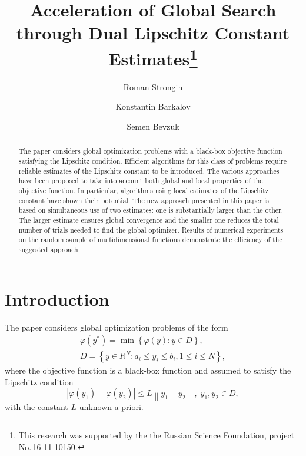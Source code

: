 \documentclass[runningheads]{llncs}
\begin{document}
%
\title{Acceleration of Global Search through Dual Lipschitz Constant Estimates\thanks{This research was supported by the the Russian Science Foundation, project No.\,16-11-10150.}}
%
%
\author{Roman Strongin%
\and Konstantin Barkalov%
\and Semen Bevzuk%
}
%
%
%
\maketitle              %
%
\begin{abstract}
The paper considers global optimization problems with a black-box objective 
function satisfying the Lipschitz condition. Efficient algorithms for this 
class of problems require reliable estimates of the Lipschitz constant to be 
introduced. The various approaches have been proposed to take into account both
global and local properties of the objective function. In particular, algorithms
using local estimates of the Lipschitz constant have shown their potential.
The new approach presented in this paper is based on simultaneous use of two
estimates: one is substantially larger than the other. 
The larger estimate ensures global convergence and the smaller one reduces 
the total number of trials needed to find the global optimizer.
Results of numerical experiments on the random sample of multidimensional 
functions demonstrate the efficiency of the suggested approach.  

\end{abstract}
%
%
%
\section{Introduction}

The paper considers global optimization problems of the form 
\begin{gather}
 \varphi(y^\ast)=\min{\left\{\varphi(y):y\in D\right\}}, \label{problem}\\
 D=\left\{y\in R^N: a_i\leq y_i \leq b_i, 1\leq i \leq N\right\} \label{D},
\end{gather}
where the objective function is a black-box function and assumed to satisfy the Lipschitz condition
\[
\left|\varphi(y_1)-\varphi(y_2)\right|\leq L\left\|y_1-y_2\right\|,\; y_1,y_2 \in D,
\]
with the constant $L$ unknown a priori.
\end{document}
